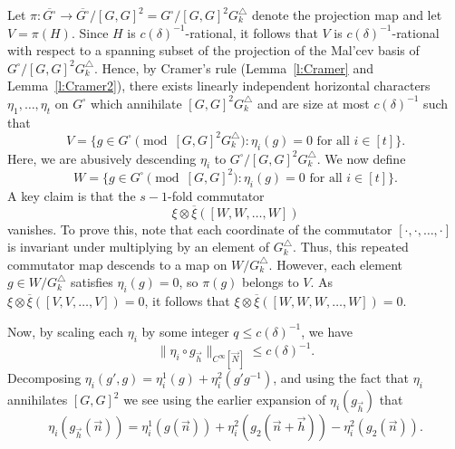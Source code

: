 \documentclass[11pt, a4paper]{amsart}
\theoremstyle{plain}
\theoremstyle{plain}
\theoremstyle{definition}
\theoremstyle{remark}
\numberwithin{equation}{section}
\numberwithin{lemma}{section}
\numberwithin{proposition}{section}
\numberwithin{corollary}{section}
\numberwithin{definition}{section}
\numberwithin{claim}{section}
\begin{document}
Let $\pi\colon \overline{G^\square} \to \overline{G^\square}/[G, G]^2 = G^\square/[G, G]^2G_k^\triangle$ denote the projection map and let $V = \pi(H)$. Since $H$ is $c(\delta)^{-1}$-rational, it follows that $V$ is $c(\delta)^{-1}$-rational with respect to a spanning subset of the projection of the Mal'cev basis of $G^\square/[G, G]^2G_k^\triangle$. Hence, by Cramer's rule (Lemma~\ref{l:Cramer} and Lemma~\ref{l:Cramer2}), there exists linearly independent horizontal characters $\eta_1, \dots, \eta_t$ on $G^\square$ which annihilate $[G, G]^2G_k^\triangle$ and are size at most $c(\delta)^{-1}$ such that
$$V = \{g \in G^\square \pmod{[G, G]^2G_k^\triangle}: \eta_i(g) = 0 \text{ for all } i \in [t]\}.$$
Here, we are abusively descending $\eta_i$ to $G^\square/[G, G]^2G_k^\triangle$. We now define
$$W = \{g \in G^\square \pmod{[G, G]^2}: \eta_i(g) = 0 \text{ for all } i \in [t]\}.$$
A key claim is that the $s - 1$-fold commutator 
$$\xi \otimes \overline{\xi}([W, W, \dots, W])$$ 
vanishes. To prove this, note that each coordinate of the commutator $[\cdot,\cdot, \dots, \cdot]$ is invariant under multiplying by an element of $G_k^\triangle$. Thus, this repeated commutator map descends to a map on $W/G_k^\triangle$. However, each element $g \in W/G_k^\triangle$ satisfies $\eta_i(g) = 0$, so $\pi(g)$ belongs to $V$. As $\xi \otimes \overline{\xi}([V, V, \dots, V]) = 0$, it follows that $\xi \otimes \overline{\xi}([W, W, W, \dots, W]) = 0$.

Now, by scaling each $\eta_i$ by some integer $q \le c(\delta)^{-1}$, we have 
$$\|\eta_i \circ g_{\vec{h}}\|_{C^\infty[\vec{N}]} \le c(\delta)^{-1}.$$
Decomposing $\eta_i(g', g) = \eta_i^1(g) + \eta_i^2(g'g^{-1})$, and using the fact that $\eta_i$ annihilates $[G, G]^2$ we see  using the earlier expansion of $\eta_i(g_{\vec{h}})$ that
$$\eta_i(g_{\vec{h}}(\vec{n})) = \eta_i^1(g(\vec{n})) + \eta_i^2(g_2(\vec{n} + \vec{h})) - \eta_i^2(g_2(\vec{n})).$$
\end{document}
